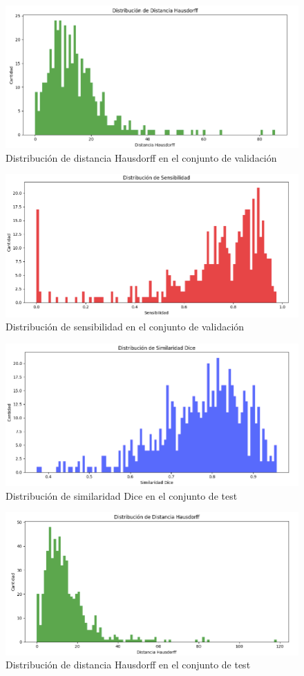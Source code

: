 \begin{figure}[H]
	\centering
	\includegraphics[width=0.75\linewidth]{imagenes/dist_haus_val.png}
	\caption{Distribución de distancia Hausdorff en el conjunto de validación}
\end{figure}

\begin{figure}[H]
	\centering
	\includegraphics[width=0.75\linewidth]{imagenes/dist_sen_val.png}
	\caption{Distribución de sensibilidad en el conjunto de validación}
\end{figure}

\begin{figure}[H]
	\centering
	\includegraphics[width=0.75\linewidth]{imagenes/dist_dice_test.png}
	\caption{Distribución de similaridad Dice en el conjunto de test}
\end{figure}

\begin{figure}[H]
	\centering
	\includegraphics[width=0.75\linewidth]{imagenes/dist_haus_test.png}
	\caption{Distribución de distancia Hausdorff en el conjunto de test}
\end{figure}

